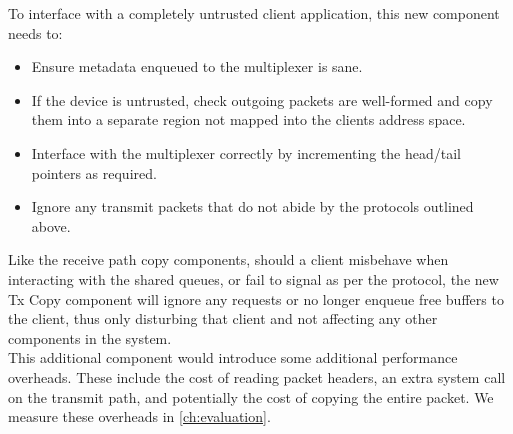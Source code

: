 To interface with a completely untrusted client application, this new component needs to:
\begin{itemize}
    \item Ensure metadata enqueued to the multiplexer is sane.
    \item If the device is untrusted, check outgoing packets are well-formed and copy them into a separate region not mapped
          into the clients address space.
    \item Interface with the multiplexer correctly by incrementing the head/tail pointers as required.
    \item Ignore any transmit packets that do not abide by the protocols outlined above.
\end{itemize}

Like the receive path copy components, should a client misbehave when interacting with the shared queues, or fail to signal as per
the protocol, the new Tx Copy component will ignore any requests or no longer enqueue free buffers to the client, thus only disturbing
that client and not affecting any other components in the system.\\
This additional component would introduce some additional performance overheads. These include the cost of reading packet headers, 
an extra system call on the transmit path, and potentially the cost of copying the entire packet. 
We measure these overheads in \autoref{ch:evaluation}.\\
